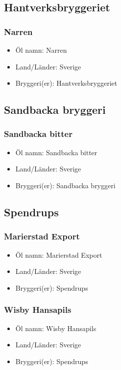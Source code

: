 \documentclass[11pt]{article}
\begin{document}
\subsection{Hantverksbryggeriet}
\label{sec:org23a09ff}
\subsubsection{Narren}
\label{sec:orgf42750f}
\begin{itemize}
\item Öl namn: Narren
\item Land/Länder: Sverige
\item Bryggeri(er): Hantverksbryggeriet
\end{itemize}
\subsection{Sandbacka bryggeri}
\label{sec:orge40c312}
\subsubsection{Sandbacka bitter}
\label{sec:org405bc52}
\begin{itemize}
\item Öl namn: Sandbacka bitter
\item Land/Länder: Sverige
\item Bryggeri(er): Sandbacka bryggeri
\end{itemize}
\subsection{Spendrups}
\label{sec:org06b4642}
\subsubsection{Marierstad Export}
\label{sec:orgf7af9eb}
\begin{itemize}
\item Öl namn: Marierstad Export
\item Land/Länder: Sverige
\item Bryggeri(er): Spendrups
\end{itemize}
\subsubsection{Wisby Hansapils}
\label{sec:orgd1461cd}
\begin{itemize}
\item Öl namn: Wisby Hansapils
\item Land/Länder: Sverige
\item Bryggeri(er): Spendrups
\end{itemize}
\end{document}
